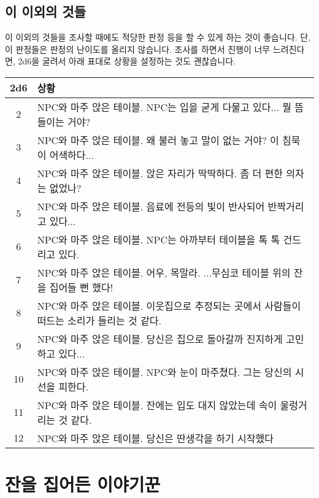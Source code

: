 \documentclass{report}
\begin{document}
	\subsection{이 이외의 것들}
	이 이외의 것들을 조사할 때에도 적당한 판정 등을 할 수 있게 하는 것이 좋습니다. 단, 이 판정들은 판정의 난이도를 올리지 않습니다. 조사를 하면서 진행이 너무 느려진다면, 2d6을 굴려서 아래 표대로 상황을 설정하는 것도 괜찮습니다.
	
	\smallskip
	
	\begin{tabularx}{\linewidth}{c!{\color{black}\vrule}X}
		2d6&상황\\\hline\hline
		
		2&NPC와 마주 앉은 테이블. NPC는 입을 굳게 다물고 있다... 뭘 뜸들이는 거야?\\\hline
		
		3&NPC와 마주 앉은 테이블. 왜 불러 놓고 말이 없는 거야? 이 침묵이 어색하다...\\\hline
		
		4&NPC와 마주 앉은 테이블. 앉은 자리가 딱딱하다. 좀 더 편한 의자는 없었나?\\\hline
		
		5&NPC와 마주 앉은 테이블. 음료에 전등의 빛이 반사되어 반짝거리고 있다...\\\hline
		
		6&NPC와 마주 앉은 테이블. NPC는 아까부터 테이블을 톡 톡 건드리고 있다.\\\hline
		
		7&NPC와 마주 앉은 테이블. 어우, 목말라. ...무심코 테이블 위의 잔을 집어들 뻔 했다!\\\hline
		
		8&NPC와 마주 앉은 테이블. 이웃집으로 추정되는 곳에서 사람들이 떠드는 소리가  들리는 것 같다.\\\hline
		
		9&NPC와 마주 앉은 테이블. 당신은 집으로 돌아갈까 진지하게 고민하고 있다...\\\hline
		
		10&NPC와 마주 앉은 테이블. NPC와 눈이 마주쳤다. 그는 당신의 시선을 피한다.\\\hline
		
		11&NPC와 마주 앉은 테이블. 잔에는 입도 대지 않았는데 속이 울렁거리는 것 같다.\\\hline
		
		12&NPC와 마주 앉은 테이블. 당신은 딴생각을 하기 시작했다
	\end{tabularx}
	
	\section{잔을 집어든 이야기꾼}
	
\end{document}
